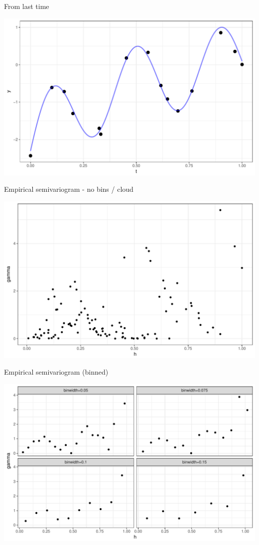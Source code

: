 \documentclass[11pt,ignorenonframetext,]{beamer}
\begin{document}
\begin{frame}{From last time}

\includegraphics{Lec13_files/figure-beamer/unnamed-chunk-4-1.pdf}

\end{frame}

\begin{frame}{Empirical semivariogram - no bins / cloud}

\includegraphics{Lec13_files/figure-beamer/unnamed-chunk-6-1.pdf}

\end{frame}

\begin{frame}{Empirical semivariogram (binned)}

\includegraphics{Lec13_files/figure-beamer/unnamed-chunk-7-1.pdf}

\end{frame}
\end{document}
